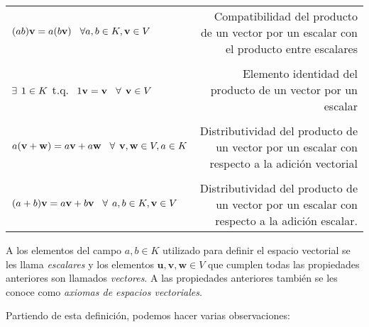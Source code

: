 \documentclass[12pt]{article}
\begin{document}
\begin{tcolorbox}
\begin{center}
\begin{tabular}{lr}
    \multirow{2}{0.35\textwidth}{$(ab)\mathbf{v}=a(b\mathbf{v})\hspace{3mm}\forall a,b\in K, \mathbf{v}\in V$} & \multirow{2}{0.47\textwidth}{Compatibilidad del producto de un vector por un escalar con el producto entre escalares} \\ \\ \\
    \multirow{2}{0.4\textwidth}{$\exists\hspace{1.5mm}1\in K$ \hspace{1.5mm} t.q. $\hspace{1.5mm}1\mathbf{v}=\mathbf{v}\hspace{3mm}\forall\hspace{1.5mm} \mathbf{v}\in V$} & \multirow{2}{0.35\textwidth}{Elemento identidad del producto de un vector por un escalar} \\ \\ \\
    \multirow{2}{0.4\textwidth}{$a(\mathbf{v}+\mathbf{w})=a\mathbf{v}+a\mathbf{w}\hspace{3mm}\forall\hspace{1.5mm} \mathbf{v},\mathbf{w}\in V, a\in K$} & \multirow{2}{0.47\textwidth}{Distributividad del producto de un vector por un escalar con respecto a la adición vectorial}  \\ \\ \\
    \multirow{2}{0.4\textwidth}{$(a+b)\mathbf{v}=a\mathbf{v}+b\mathbf{v}\hspace{3mm}\forall\hspace{1.5mm} a,b\in K, \mathbf{v}\in V$} & \multirow{2}{0.47\textwidth}{Distributividad del producto de un vector por un escalar con respecto a la adición escalar.} \\ \\
\end{tabular}
\end{center}

\hspace{2.5mm} A los elementos del campo $a,b \in K$ utilizado para definir el espacio vectorial se les llama \textit{escalares} y los elementos $\mathbf{u},\mathbf{v},\mathbf{w}\in V$ que cumplen todas las propiedades anteriores son llamados \textit{vectores}. A las propiedades anteriores también se les conoce como \textit{axiomas de espacios vectoriales}.

\end{tcolorbox}
 

Partiendo de esta definición, podemos hacer varias observaciones:
\end{document}
